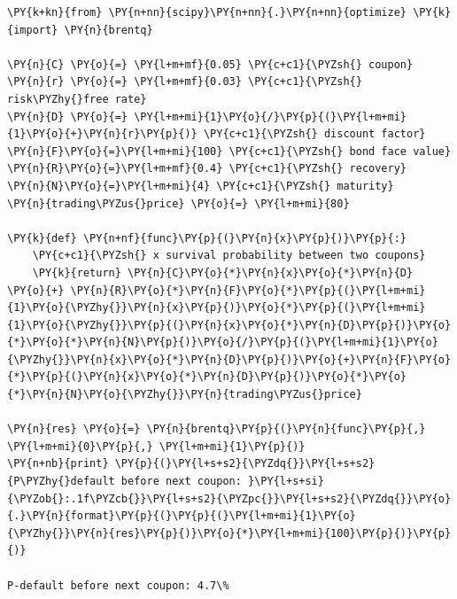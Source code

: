 \begin{tcolorbox}[breakable, size=fbox, boxrule=1pt, pad at break*=1mm,colback=cellbackground, colframe=cellborder]
\begin{Verbatim}[commandchars=\\\{\}]
\PY{k+kn}{from} \PY{n+nn}{scipy}\PY{n+nn}{.}\PY{n+nn}{optimize} \PY{k}{import} \PY{n}{brentq}
	
\PY{n}{C} \PY{o}{=} \PY{l+m+mf}{0.05} \PY{c+c1}{\PYZsh{} coupon}
\PY{n}{r} \PY{o}{=} \PY{l+m+mf}{0.03} \PY{c+c1}{\PYZsh{} risk\PYZhy{}free rate}
\PY{n}{D} \PY{o}{=} \PY{l+m+mi}{1}\PY{o}{/}\PY{p}{(}\PY{l+m+mi}{1}\PY{o}{+}\PY{n}{r}\PY{p}{)} \PY{c+c1}{\PYZsh{} discount factor}
\PY{n}{F}\PY{o}{=}\PY{l+m+mi}{100} \PY{c+c1}{\PYZsh{} bond face value}
\PY{n}{R}\PY{o}{=}\PY{l+m+mf}{0.4} \PY{c+c1}{\PYZsh{} recovery}
\PY{n}{N}\PY{o}{=}\PY{l+m+mi}{4} \PY{c+c1}{\PYZsh{} maturity}
\PY{n}{trading\PYZus{}price} \PY{o}{=} \PY{l+m+mi}{80}
	
\PY{k}{def} \PY{n+nf}{func}\PY{p}{(}\PY{n}{x}\PY{p}{)}\PY{p}{:}
	\PY{c+c1}{\PYZsh{} x survival probability between two coupons}
	\PY{k}{return} \PY{n}{C}\PY{o}{*}\PY{n}{x}\PY{o}{*}\PY{n}{D} \PY{o}{+} \PY{n}{R}\PY{o}{*}\PY{n}{F}\PY{o}{*}\PY{p}{(}\PY{l+m+mi}{1}\PY{o}{\PYZhy{}}\PY{n}{x}\PY{p}{)}\PY{o}{*}\PY{p}{(}\PY{l+m+mi}{1}\PY{o}{\PYZhy{}}\PY{p}{(}\PY{n}{x}\PY{o}{*}\PY{n}{D}\PY{p}{)}\PY{o}{*}\PY{o}{*}\PY{n}{N}\PY{p}{)}\PY{o}{/}\PY{p}{(}\PY{l+m+mi}{1}\PY{o}{\PYZhy{}}\PY{n}{x}\PY{o}{*}\PY{n}{D}\PY{p}{)}\PY{o}{+}\PY{n}{F}\PY{o}{*}\PY{p}{(}\PY{n}{x}\PY{o}{*}\PY{n}{D}\PY{p}{)}\PY{o}{*}\PY{o}{*}\PY{n}{N}\PY{o}{\PYZhy{}}\PY{n}{trading\PYZus{}price}
	
\PY{n}{res} \PY{o}{=} \PY{n}{brentq}\PY{p}{(}\PY{n}{func}\PY{p}{,} \PY{l+m+mi}{0}\PY{p}{,} \PY{l+m+mi}{1}\PY{p}{)}
\PY{n+nb}{print} \PY{p}{(}\PY{l+s+s2}{\PYZdq{}}\PY{l+s+s2}{P\PYZhy{}default before next coupon: }\PY{l+s+si}{\PYZob{}:.1f\PYZcb{}}\PY{l+s+s2}{\PYZpc{}}\PY{l+s+s2}{\PYZdq{}}\PY{o}{.}\PY{n}{format}\PY{p}{(}\PY{p}{(}\PY{l+m+mi}{1}\PY{o}{\PYZhy{}}\PY{n}{res}\PY{p}{)}\PY{o}{*}\PY{l+m+mi}{100}\PY{p}{)}\PY{p}{)}

P-default before next coupon: 4.7\%
\end{Verbatim}
\end{tcolorbox}

